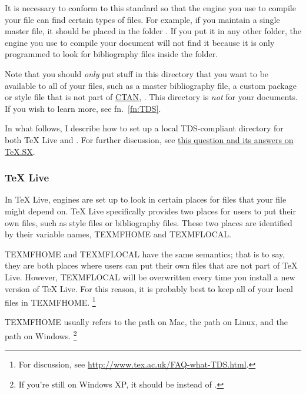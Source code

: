 It is necessary to conform to this standard so that the engine you use to compile your  file can find certain types of files.
For example, if you maintain a single master  file, it should be placed in the folder .
If you put it in any other folder, the engine you use to compile your document will not find it because it is only programmed to look for bibliography files inside the  folder.

Note that you should \emph{only} put stuff in this directory that you want to be available to all of your  files, such as a master bibliography file, a custom package or style file that is not part of \href{http://ctan.org/}{CTAN}, \ETC.
This directory is \emph{not} for your  documents.
If you wish to learn more, see fn.~\ref{fn:TDS}.

In what follows, I describe how to set up a local TDS-compliant directory for both TeX Live and .
For further discussion, see \href{http://tex.stackexchange.com/q/1137/32888}{this question and its answers on TeX.SX}.

\subsubsection{TeX Live}
\label{subsubsec:local-files:tex-live}

In TeX Live, engines are set up to look in certain places for files that your  file might depend on.
TeX Live specifically provides two places for users to put their own files, such as style files or bibliography files.
These two places are identified by their variable names, TEXMFHOME and TEXMFLOCAL.

TEXMFHOME and TEXMFLOCAL have the same semantics; that is to say, they are both places where users can put their own files that are not part of TeX Live.
However, TEXMFLOCAL will be overwritten every time you install a new version of TeX Live.
For this reason, it is probably best to keep all of your local files in TEXMFHOME.%
\footnote{%
For discussion, see \url{http://www.tex.ac.uk/FAQ-what-TDS.html}.%
}

TEXMFHOME usually refers to the path  on Mac, the path  on Linux, and the path  on Windows.%
\footnote{%
If you're still on Windows XP, it should be  instead of .%
}

